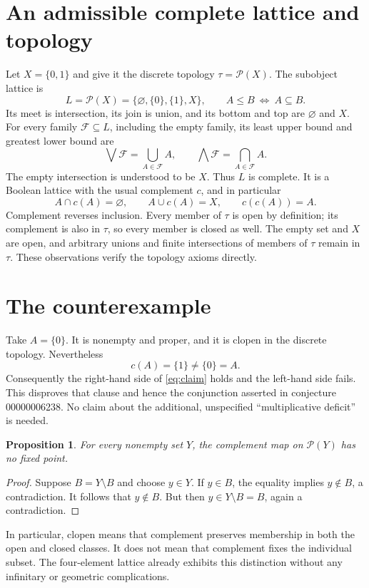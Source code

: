 \documentclass[10pt,a4paper]{article}
\newtheorem{proposition}{Proposition}
\newcommand{\Pow}{\mathcal P}
\begin{document}
\section{An admissible complete lattice and topology}
Let $X=\{0,1\}$ and give it the discrete topology $\tau=\Pow(X)$.
The subobject lattice is
\[
 L=\Pow(X)=\{\varnothing,\{0\},\{1\},X\},
 \qquad A\leq B\ \Longleftrightarrow\ A\subseteq B.
\]
Its meet is intersection, its join is union, and its bottom and top are
$\varnothing$ and $X$. For every family $\mathcal F\subseteq L$, including
the empty family, its least upper bound and greatest lower bound are
\[
 \bigvee\mathcal F=\bigcup_{A\in\mathcal F} A,
 \qquad
 \bigwedge\mathcal F=\bigcap_{A\in\mathcal F} A.
\]
The empty intersection is understood to be $X$. Thus $L$ is complete.
It is a Boolean lattice with the usual complement $c$, and in particular
\[
 A\cap c(A)=\varnothing,\qquad A\cup c(A)=X,
 \qquad c(c(A))=A.
\]
Complement reverses inclusion. Every member of $\tau$ is open by
definition; its complement is also in $\tau$, so every member is closed
as well. The empty set and $X$ are open, and arbitrary unions and finite
intersections of members of $\tau$ remain in $\tau$. These observations
verify the topology axioms directly.

\section{The counterexample}
Take $A=\{0\}$. It is nonempty and proper, and it is clopen in the
discrete topology. Nevertheless
\[
 c(A)=\{1\}\ne\{0\}=A.
\]
Consequently the right-hand side of \eqref{eq:claim} holds and the
left-hand side fails. This disproves that clause and hence the conjunction
asserted in conjecture 00000006238. No claim about the additional,
unspecified ``multiplicative deficit'' is needed.

\begin{proposition}
For every nonempty set $Y$, the complement map on $\Pow(Y)$ has no fixed
point.
\end{proposition}
\begin{proof}
Suppose $B=Y\setminus B$ and choose $y\in Y$. If $y\in B$, the equality
implies $y\notin B$, a contradiction. It follows that $y\notin B$.
But then $y\in Y\setminus B=B$, again a contradiction.
\end{proof}

In particular, clopen means that complement preserves membership in both
the open and closed classes. It does not mean that complement fixes the
individual subset. The four-element lattice already exhibits this
distinction without any infinitary or geometric complications.
\end{document}

